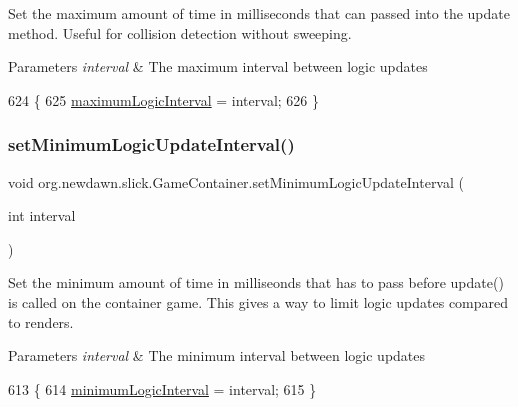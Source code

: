 Set the maximum amount of time in milliseconds that can passed into the update method. Useful for collision detection without sweeping.


\begin{DoxyParams}{Parameters}
{\em interval} & The maximum interval between logic updates \\
\hline
\end{DoxyParams}

\begin{DoxyCode}
624                                                             \{
625         \mbox{\hyperlink{classorg_1_1newdawn_1_1slick_1_1_game_container_ac204ec48e1105e745aca11cd0b1c4a3e}{maximumLogicInterval}} = interval;
626     \}
\end{DoxyCode}
\mbox{\label{classorg_1_1newdawn_1_1slick_1_1_game_container_ab502c60592e629c98f26fb3136a66575}} 
\subsubsection{\texorpdfstring{set\+Minimum\+Logic\+Update\+Interval()}{setMinimumLogicUpdateInterval()}}
{\footnotesize\ttfamily void org.\+newdawn.\+slick.\+Game\+Container.\+set\+Minimum\+Logic\+Update\+Interval (\begin{DoxyParamCaption}\item[{int}]{interval }\end{DoxyParamCaption})\hspace{0.3cm}{\ttfamily [inline]}}

Set the minimum amount of time in milliseonds that has to pass before update() is called on the container game. This gives a way to limit logic updates compared to renders.


\begin{DoxyParams}{Parameters}
{\em interval} & The minimum interval between logic updates \\
\hline
\end{DoxyParams}

\begin{DoxyCode}
613                                                             \{
614         \mbox{\hyperlink{classorg_1_1newdawn_1_1slick_1_1_game_container_aad789db3caee5d97a3e6d82adcdbe7c1}{minimumLogicInterval}} = interval;
615     \}
\end{DoxyCode}
\mbox{\label{classorg_1_1newdawn_1_1slick_1_1_game_container_a13e789e67755f14bad1caf70e3bd6d4e}} 
